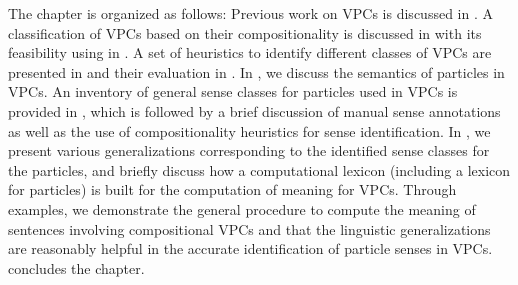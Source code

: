 \documentclass[output=paper
,modfonts
,nonflat]{langsci/langscibook}
\begin{document}

The chapter is organized as follows: Previous work on VPCs is discussed in . A classification of VPCs based on their compositionality is discussed in  with its feasibility using  in . A set of heuristics to identify different classes of VPCs are presented in  and their evaluation in . In , we discuss the semantics of particles in VPCs. An inventory of general sense classes for particles used in VPCs is provided in , which is followed by a brief discussion of manual sense annotations as well as the use of compositionality heuristics for sense identification. In , we present various generalizations corresponding to the identified sense classes for the particles, and briefly discuss how a computational lexicon (including a lexicon for particles) is built for the computation of meaning for VPCs. Through examples, we demonstrate the general procedure to compute the meaning of sentences involving compositional VPCs and that the linguistic generalizations are reasonably helpful in the accurate identification of particle senses in VPCs.  concludes the chapter.
\end{document}
